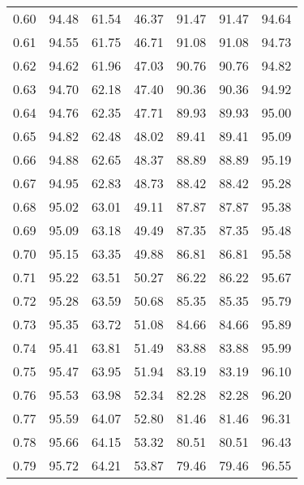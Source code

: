 \begin{tabular}{|c|c|c|c|c|c|c|}
      0.60 &     94.48 &     61.54 &      46.37 &   91.47 &      91.47 &         94.64 \\
      0.61 &     94.55 &     61.75 &      46.71 &   91.08 &      91.08 &         94.73 \\
      0.62 &     94.62 &     61.96 &      47.03 &   90.76 &      90.76 &         94.82 \\
      0.63 &     94.70 &     62.18 &      47.40 &   90.36 &      90.36 &         94.92 \\
      0.64 &     94.76 &     62.35 &      47.71 &   89.93 &      89.93 &         95.00 \\
      0.65 &     94.82 &     62.48 &      48.02 &   89.41 &      89.41 &         95.09 \\
      0.66 &     94.88 &     62.65 &      48.37 &   88.89 &      88.89 &         95.19 \\
      0.67 &     94.95 &     62.83 &      48.73 &   88.42 &      88.42 &         95.28 \\
      0.68 &     95.02 &     63.01 &      49.11 &   87.87 &      87.87 &         95.38 \\
      0.69 &     95.09 &     63.18 &      49.49 &   87.35 &      87.35 &         95.48 \\
      0.70 &     95.15 &     63.35 &      49.88 &   86.81 &      86.81 &         95.58 \\
      0.71 &     95.22 &     63.51 &      50.27 &   86.22 &      86.22 &         95.67 \\
      0.72 &     95.28 &     63.59 &      50.68 &   85.35 &      85.35 &         95.79 \\
      0.73 &     95.35 &     63.72 &      51.08 &   84.66 &      84.66 &         95.89 \\
      0.74 &     95.41 &     63.81 &      51.49 &   83.88 &      83.88 &         95.99 \\
      0.75 &     95.47 &     63.95 &      51.94 &   83.19 &      83.19 &         96.10 \\
      0.76 &     95.53 &     63.98 &      52.34 &   82.28 &      82.28 &         96.20 \\
      0.77 &     95.59 &     64.07 &      52.80 &   81.46 &      81.46 &         96.31 \\
      0.78 &     95.66 &     64.15 &      53.32 &   80.51 &      80.51 &         96.43 \\
      0.79 &     95.72 &     64.21 &      53.87 &   79.46 &      79.46 &         96.55 \\

\end{tabular}

